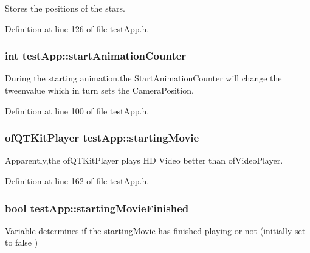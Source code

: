 Stores the positions of the stars. 



Definition at line 126 of file test\-App.\-h.

\hypertarget{classtest_app_a577bf117cf10109de967ea0d3ca17f1f}{
\subsubsection[{start\-Animation\-Counter}]{\setlength{\rightskip}{0pt plus 5cm}int test\-App\-::start\-Animation\-Counter}}\label{classtest_app_a577bf117cf10109de967ea0d3ca17f1f}


During the starting animation,the Start\-Animation\-Counter will change the tweenvalue which in turn sets the Camera\-Position. 



Definition at line 100 of file test\-App.\-h.

\hypertarget{classtest_app_a9bfe7793fa0689a991ff64174745c38f}{
\subsubsection[{starting\-Movie}]{\setlength{\rightskip}{0pt plus 5cm}of\-Q\-T\-Kit\-Player test\-App\-::starting\-Movie}}\label{classtest_app_a9bfe7793fa0689a991ff64174745c38f}


Apparently,the of\-Q\-T\-Kit\-Player plays H\-D Video better than of\-Video\-Player. 



Definition at line 162 of file test\-App.\-h.

\hypertarget{classtest_app_aea3cb9f5f0061a42a4953d6b6c949036}{
\subsubsection[{starting\-Movie\-Finished}]{\setlength{\rightskip}{0pt plus 5cm}bool test\-App\-::starting\-Movie\-Finished}}\label{classtest_app_aea3cb9f5f0061a42a4953d6b6c949036}


Variable determines if the starting\-Movie has finished playing or not (initially set to false ) 



